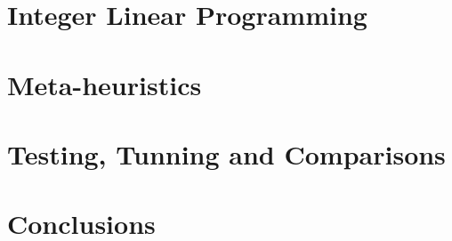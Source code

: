 \documentclass[a4paper]{article}
\begin{document}
\section{Integer Linear Programming}


\section{Meta-heuristics}





\section{Testing, Tunning and Comparisons}






\section{Conclusions}

\end{document}

